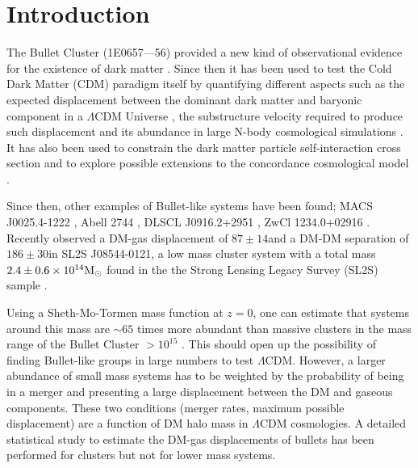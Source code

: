\documentclass{emulateapj}
\newcommand{\hkpc}{{\ifmmode{h^{-1}{\rm kpc}}\else{$h^{-1}$kpc }\fi}}
\newcommand{\hMsun}{{\ifmmode{h^{-1}{\rm {M_{\odot}}}}\else{$h^{-1}{\rm{M_{\odot}}}$}\fi}}
\newcommand{\Msun}{{\ifmmode{{\rm {M_{\odot}}}}\else{${\rm{M_{\odot}}}$}\fi}}
\newcommand{\bulla}{1E0657---56}
\newcommand{\bullg}{SL2S J08544-0121}
\begin{document}


\section{Introduction}


The Bullet Cluster (\bulla) provided a new kind of observational
evidence for the existence of dark matter
\citep{Markevitch2004,Clowe2006}. Since then it has been used to test
the Cold Dark Matter (CDM) paradigm itself by quantifying different
aspects such as the expected displacement between the dominant dark
matter and baryonic component in a $\Lambda$CDM Universe
\citep{ForeroRomero2010}, the substructure velocity required to
produce such displacement
\citep{Milosavljevic2007,Springel2007,Mastropietro2008} and its
abundance in large N-body cosmological simulations
\citep{Hayashi2006,Lee2012, Thompson2012}. It has also been used to
constrain the dark matter particle self-interaction cross section and
to explore possible extensions to the concordance cosmological model
\citep{Farrar2007,Lee2010}.  
 

Since then, other examples of Bullet-like systems have been found; 
MACS J0025.4-1222 \citep{Bradac2008}, Abell 2744 \citep{Merten2011},
DLSCL J0916.2+2951 \citep{Dawson2012}, ZwCl 1234.0+02916
\citep{Dahle2013}. Recently \cite{Gastaldello} observed a DM-gas
displacement of $87\pm 14$\hkpc and a DM-DM separation of $186\pm
30$\hkpc in \bullg, a low mass cluster system with a total
mass $2.4\pm 0.6 \times 10^{14}\Msun$ found in the the Strong Lensing
Legacy Survey (SL2S) sample \citep{Cabanac2007,More2012}.


Using a Sheth-Mo-Tormen mass function at $z=0$, one can estimate that
systems around this mass are $\sim 65$ times more abundant than massive
clusters in the mass range of the Bullet Cluster $>10^{15}$\hMsun
\citep{Sheth2001,hmfcalc}. This  should open up the possibility of
finding Bullet-like groups in large numbers to test
$\Lambda$CDM. However, a larger abundance of small mass systems has to
be weighted by the probability of being in a merger and  presenting a
large displacement between the DM and gaseous components.  These two
conditions (merger rates, maximum possible displacement) are a function
of DM halo mass in $\Lambda$CDM cosmologies.  A detailed statistical
study to estimate the DM-gas displacements of bullets has been
performed for clusters \citep{ForeroRomero2010} but not for lower mass
systems. 
\end{document}
